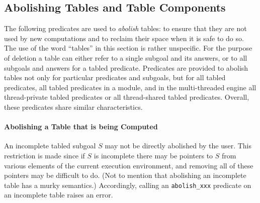 \begin{description}



\subsection{Abolishing Tables and Table Components}
\label{sec:TablePred:Deleting}

The following predicates are used to {\em abolish} tables: to ensure
that they are not used by new computations and to reclaim their space
when it is safe to do so.  The use of the word ``tables'' in this
section is rather unspecific.  For the purpose of deletion a table can
either refer to a single subgoal and its answers, or to all subgoals
and answers for a tabled predicate.  Predicates are provided to
abolish tables not only for particular predicates and subgoals, but
for all tabled predicates, all tabled predicates in a module, and in
the multi-threaded engine all thread-private tabled predicates or all
thread-shared tabled predicates.  Overall, these predicates share
similar characteristics.

\paragraph{Abolishing a Table that is being Computed}
An incomplete tabled subgoal $S$ may not be directly abolished by the
user.  This restriction is made since if $S$ is incomplete there may
be pointers to $S$ from various elements of the current execution
environment, and removing all of these pointers may be difficult to
do. (Not to mention that abolishing an incomplete table has a murky
semantics.)  Accordingly, calling an {\tt abolish\_xxx} predicate on
an incomplete table raises an error.  


\end{description}
